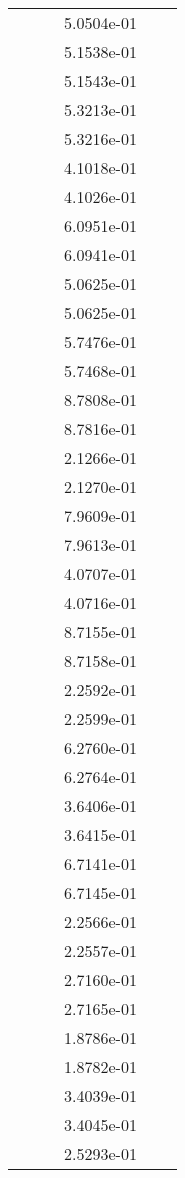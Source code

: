\begin{xltabular}{\textwidth}{r|rS[table-format=1.3e+2]S[table-format=1.4e+2]S[table-format=1.4e+2]S[table-format=-1.5]}
&  &  & 5.0504e-01 & & \\
&  &  & 5.1538e-01 & & \\
&  &  & 5.1543e-01 & & \\
&  &  & 5.3213e-01 & & \\
&  &  & 5.3216e-01 & & \\
&  &  & 4.1018e-01 & & \\
&  &  & 4.1026e-01 & & \\
&  &  & 6.0951e-01 & & \\
&  &  & 6.0941e-01 & & \\
&  &  & 5.0625e-01 & & \\
&  &  & 5.0625e-01 & & \\
&  &  & 5.7476e-01 & & \\
&  &  & 5.7468e-01 & & \\
&  &  & 8.7808e-01 & & \\
&  &  & 8.7816e-01 & & \\
&  &  & 2.1266e-01 & & \\
&  &  & 2.1270e-01 & & \\
&  &  & 7.9609e-01 & & \\
&  &  & 7.9613e-01 & & \\
&  &  & 4.0707e-01 & & \\
&  &  & 4.0716e-01 & & \\
&  &  & 8.7155e-01 & & \\
&  &  & 8.7158e-01 & & \\
&  &  & 2.2592e-01 & & \\
&  &  & 2.2599e-01 & & \\
&  &  & 6.2760e-01 & & \\
&  &  & 6.2764e-01 & & \\
&  &  & 3.6406e-01 & & \\
&  &  & 3.6415e-01 & & \\
&  &  & 6.7141e-01 & & \\
&  &  & 6.7145e-01 & & \\
&  &  & 2.2566e-01 & & \\
&  &  & 2.2557e-01 & & \\
&  &  & 2.7160e-01 & & \\
&  &  & 2.7165e-01 & & \\
&  &  & 1.8786e-01 & & \\
&  &  & 1.8782e-01 & & \\
&  &  & 3.4039e-01 & & \\
&  &  & 3.4045e-01 & & \\
&  &  & 2.5293e-01 & & \\

\end{xltabular}
